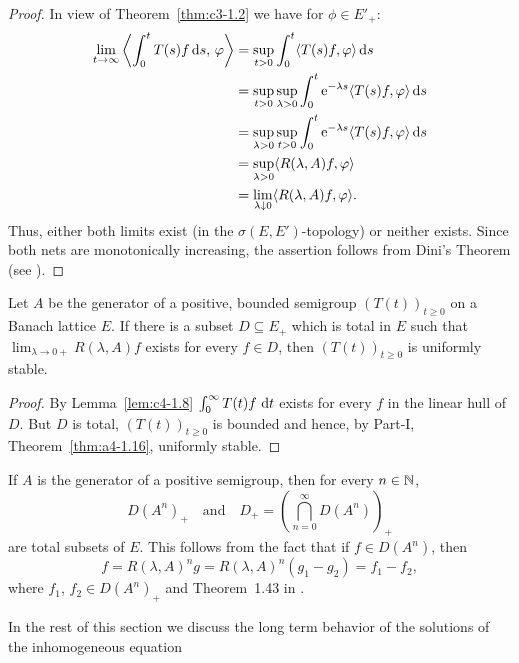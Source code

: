 \begin{proof}
In view of Theorem~\ref{thm:c3-1.2}  we have for $\phi \in E'_{+}$:
\begin{align*}
\lim_{t \to \infty}  \left\langle\int_{0}^{t} T(s)f \ds  ,\,\phi\right\rangle &= \sup_{t>0} \int_{0}^{t}\langle T(s)f,\phi\rangle \ds \\
&= \sup_{t>0}\sup_{\lambda>0} \int_{0}^{t}\eu^{-\lambda s}\langle T(s)f,\phi\rangle \ds \\
&= \sup_{\lambda>0}\sup_{t>0} \int_{0}^{t}\eu^{-\lambda s}\langle T(s)f,\phi\rangle \ds \\
&= \sup_{\lambda>0} \langle R(\lambda,A)f,\phi\rangle \\
&= \lim_{\lambda \downarrow 0} \langle R(\lambda,A)f,\phi\rangle.
\end{align*}
Thus, either both limits exist (in the $\sigma(E,E')$-topology) or neither exists.
Since both nets are monotonically increasing, the assertion follows from Dini's Theorem (see \textcite[II. Theorem~5.9]{schaefer:1974}).
\end{proof}
\begin{proposition}\label{prop:c4-1.9}
%
Let $A$ be the generator of a positive, bounded semigroup $(T(t))_{t \geq 0}$ on a Banach lattice $E$.
If there is a subset $D \subseteq E_{+}$ which is total in $E$ such that $\lim_{\lambda \to 0+} R(\lambda,A)f$ exists for every $f \in D$, then $(T(t))_{t \geq 0}$ is uniformly stable.
\end{proposition}
\begin{proof}
By Lemma~\ref{lem:c4-1.8} $\int_{0}^{\infty} T(t)f \, \mathop{}\!\mathrm{d}{t}$ exists for every $f$ in the linear hull of\/ $D$.
But $D$ is total, $(T(t))_{t \geq 0}$ is bounded and hence, by Part-I, Theorem~\ref{thm:a4-1.16}, uniformly stable.
\end{proof}
\begin{remark}\label{rem:c4-1.10}
If\/ $A$ is the generator of a positive semigroup, then for every $n \in \mathbb{N}$, 
\[
D(A^{n})_{+}
\quad \text{and} \quad 
D_{+} =  \left(\bigcap_{n=0}^{\infty} D(A^{n})\right)_{+}
\]
are total subsets of\/ $E$.
This follows from the fact that if  $f \in D(A^{n})$, then 
\[
    f = R(\lambda,A)^{n}g = R(\lambda,A)^{n}(g_{1} - g_{2}) = f_{1} - f_{2},
\]
where $f_{1}$, $f_{2} \in D(A^{n})_{+}$ and Theorem~1.43 in \textcite{davies:1980}.
\end{remark}
In the rest of this section we discuss the long term behavior of the solutions of the inhomogeneous equation
